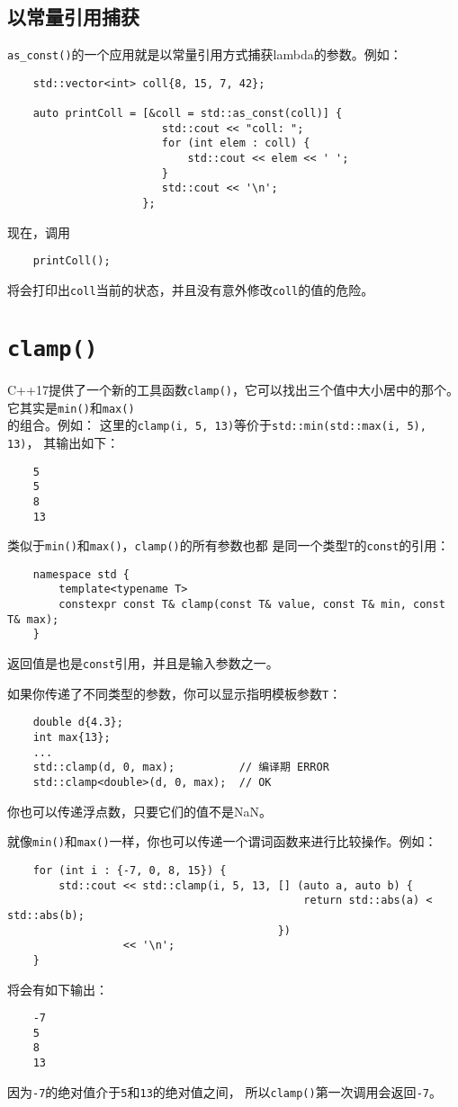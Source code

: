 \subsection{以常量引用捕获}\label{ch25.2.1}
\texttt{as\_const()}的一个应用就是以常量引用方式捕获lambda的参数。例如：
\begin{lstlisting}
    std::vector<int> coll{8, 15, 7, 42};

    auto printColl = [&coll = std::as_const(coll)] {
                        std::cout << "coll: ";
                        for (int elem : coll) {
                            std::cout << elem << ' ';
                        }
                        std::cout << '\n';
                     };
\end{lstlisting}
现在，调用
\begin{lstlisting}
    printColl();
\end{lstlisting}
将会打印出\texttt{coll}当前的状态，并且没有意外修改\texttt{coll}的值的危险。


\section{\texttt{clamp()}}
C++17提供了一个新的工具函数\texttt{clamp()}，它可以找出三个值中大小居中的那个。
它其实是\texttt{min()}和\texttt{max()}\\
的组合。例如：
这里的\texttt{clamp(i, 5, 13)}等价于\texttt{std::min(std::max(i, 5), 13)}，
其输出如下：
\begin{lstlisting}
    5
    5
    8
    13
\end{lstlisting}
类似于\texttt{min()}和\texttt{max()}，\texttt{clamp()}的所有参数也都
是同一个类型\texttt{T}的\texttt{const}的引用：
\begin{lstlisting}
    namespace std {
        template<typename T>
        constexpr const T& clamp(const T& value, const T& min, const T& max);
    }
\end{lstlisting}
返回值是也是\texttt{const}引用，并且是输入参数之一。

如果你传递了不同类型的参数，你可以显示指明模板参数\texttt{T}：
\begin{lstlisting}
    double d{4.3};
    int max{13};
    ...
    std::clamp(d, 0, max);          // 编译期 ERROR
    std::clamp<double>(d, 0, max);  // OK
\end{lstlisting}
你也可以传递浮点数，只要它们的值不是NaN。

就像\texttt{min()}和\texttt{max()}一样，你也可以传递一个谓词函数来进行比较操作。例如：
\begin{lstlisting}
    for (int i : {-7, 0, 8, 15}) {
        std::cout << std::clamp(i, 5, 13, [] (auto a, auto b) {
                                              return std::abs(a) < std::abs(b);
                                          })
                  << '\n';
    }
\end{lstlisting}
将会有如下输出：
\begin{lstlisting}
    -7
    5
    8
    13
\end{lstlisting}
因为\texttt{-7}的绝对值介于\texttt{5}和\texttt{13}的绝对值之间，
所以\texttt{clamp()}第一次调用会返回\texttt{-7}。

